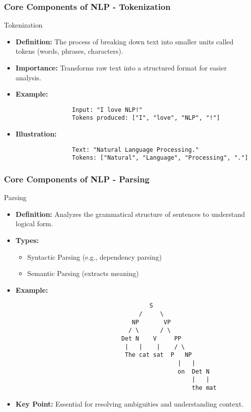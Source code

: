 \documentclass{beamer}
\begin{document}
\begin{frame}[fragile]
    \frametitle{Core Components of NLP - Tokenization}
    \begin{block}{Tokenization}
        \begin{itemize}
            \item \textbf{Definition:} The process of breaking down text into smaller units called tokens (words, phrases, characters).
            \item \textbf{Importance:} Transforms raw text into a structured format for easier analysis.
            \item \textbf{Example:}
            \begin{lstlisting}
                Input: "I love NLP!"
                Tokens produced: ["I", "love", "NLP", "!"]
            \end{lstlisting}
            \item \textbf{Illustration:}
            \begin{lstlisting}
                Text: "Natural Language Processing."
                Tokens: ["Natural", "Language", "Processing", "."]
            \end{lstlisting}
        \end{itemize}
    \end{block}
\end{frame}

\begin{frame}[fragile]
    \frametitle{Core Components of NLP - Parsing}
    \begin{block}{Parsing}
        \begin{itemize}
            \item \textbf{Definition:} Analyzes the grammatical structure of sentences to understand logical form.
            \item \textbf{Types:}
            \begin{itemize}
                \item Syntactic Parsing (e.g., dependency parsing)
                \item Semantic Parsing (extracts meaning)
            \end{itemize}
            \item \textbf{Example:}
            \begin{lstlisting}
                                      S
                                   /     \
                                 NP       VP
                                / \      / \
                              Det N    V     PP
                               |   |    |    / \
                               The cat sat  P   NP
                                              |   |
                                              on  Det N
                                                  |   |
                                                  the mat
            \end{lstlisting}
            \item \textbf{Key Point:} Essential for resolving ambiguities and understanding context.
        \end{itemize}
    \end{block}
\end{frame}
\end{document}
